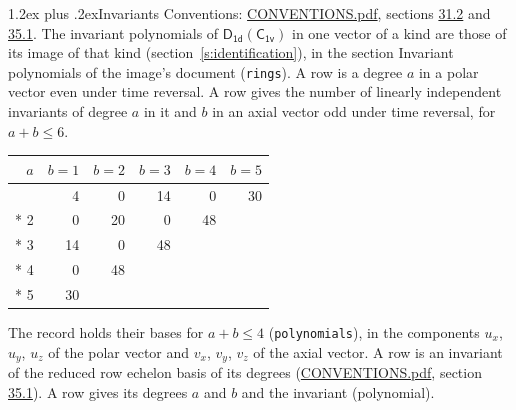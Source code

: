 \documentclass[10pt,a4paper]{article}
\makeatletter
\renewcommand\section{\@startsection{section}{1}{\z@}{-3ex plus -1ex minus -.2ex}%
  {1.2ex plus .2ex}{\normalfont\large\sffamily\bfseries\color{parttitle}}}
\numberwithin{equation}{section}
\newcommand{\grp}[1]{\mathsf{#1}}
\makeatother
\begin{document}
\section{Invariants}\label{s:invariants}
Conventions: \href{../../CONVENTIONS.pdf}{CONVENTIONS.pdf}, sections \href{../../CONVENTIONS.pdf\#conv.31.2}{31.2} and \href{../../CONVENTIONS.pdf\#conv.35.1}{35.1}.
The invariant polynomials of $\grp{D_{1d}}(\grp{C_{1v}})$ in one vector of a kind are those of its image of that kind (section~\ref{s:identification}), in the section Invariant polynomials of the image's document (\texttt{rings}).
\leavevmode\label{n:index.degree.polar}\label{n:index.degree.axial}A row is a degree $a$ in a polar vector even under time reversal. A row gives the number of linearly independent invariants of degree $a$ in it and $b$ in an axial vector odd under time reversal, for $a + b \le 6$.
{\small\begin{longtable}{@{}rrrrrr@{}}\toprule
$a$ & $b = 1$ & $b = 2$ & $b = 3$ & $b = 4$ & $b = 5$\\\midrule\endhead
\bottomrule\endfoot\endlastfoot
1 & 4 & 0 & 14 & 0 & 30\\*
2 & 0 & 20 & 0 & 48 & \\*
3 & 14 & 0 & 48 &  & \\*
4 & 0 & 48 &  &  & \\*
5 & 30 &  &  &  & \\
\bottomrule\end{longtable}}
\leavevmode\label{n:local.component.polar}\label{n:local.component.axial}The record holds their bases for $a + b \le 4$ (\texttt{polynomials}), in the components $u_{x}$, $u_{y}$, $u_{z}$ of the polar vector and $v_{x}$, $v_{y}$, $v_{z}$ of the axial vector. \label{n:head.polynomial}A row is an invariant of the reduced row echelon basis of its degrees (\href{../../CONVENTIONS.pdf}{CONVENTIONS.pdf}, section \href{../../CONVENTIONS.pdf\#conv.35.1}{35.1}). A row gives its degrees $a$ and $b$ and the invariant (polynomial).
\end{document}
